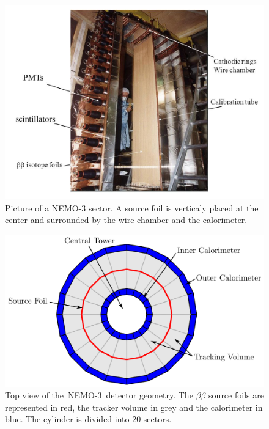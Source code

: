 \documentclass[main.tex]{subfiles}
\begin{document}
\begin{figure}[h!]
\begin{center}
\includegraphics[scale=0.55]{pictures/Chap2/sector.jpg}
\caption{Picture of a NEMO-3 sector. A source foil is verticaly placed at the center and surrounded by the wire chamber and the calorimeter.}
\label{NEMO3SectorPictures}
\end{center}
\end{figure}


\begin{figure}[h!]
\begin{center}
\includegraphics[scale=0.25]{pictures/Chap2/TopViewNEMO3.png}
\caption{Top view of the~NEMO-3~detector geometry. The $\beta\beta$ source foils are represented in red, the tracker volume in grey and the calorimeter in blue. The cylinder is divided into 20 sectors.}
\label{TopViewNEMO3}
\end{center}
\end{figure}
\end{document}
